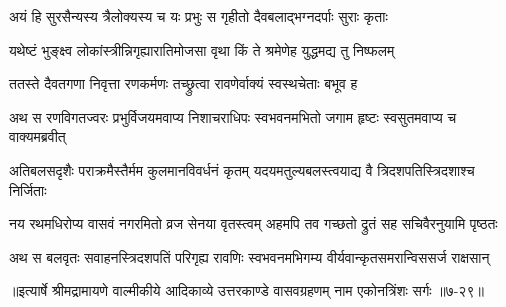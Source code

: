 \twolineshloka
{अयं हि सुरसैन्यस्य त्रैलोक्यस्य च यः प्रभुः}
{स गृहीतो दैवबलाद्भग्नदर्पाः सुराः कृताः} %

\twolineshloka
{यथेष्टं भुङ्क्ष्व लोकांस्त्रीन्निगृह्यारातिमोजसा}
{वृथा किं ते श्रमेणेह युद्धमद्य तु निष्फलम्} %

\twolineshloka
{ततस्ते दैवतगणा निवृत्ता रणकर्मणः}
{तच्छ्रुत्वा रावणेर्वाक्यं स्वस्थचेताः बभूव ह} %

\twolineshloka
{अथ स रणविगतज्वरः प्रभुर्विजयमवाप्य निशाचराधिपः}
{स्वभवनमभितो जगाम हृष्टः स्वसुतमवाप्य च वाक्यमब्रवीत्} %

\twolineshloka
{अतिबलसदृशैः पराक्रमैस्तैर्मम कुलमानविवर्धनं कृतम्}
{यदयमतुल्यबलस्त्वयाद्य वै त्रिदशपतिस्त्रिदशाश्च निर्जिताः} %

\twolineshloka
{नय रथमधिरोप्य वासवं नगरमितो व्रज सेनया वृतस्त्वम्}
{अहमपि तव गच्छतो द्रुतं सह सचिवैरनुयामि पृष्ठतः} %

\twolineshloka
{अथ स बलवृतः सवाहनस्त्रिदशपतिं परिगृह्य रावणिः}
{स्वभवनमभिगम्य वीर्यवान्कृतसमरान्विससर्ज राक्षसान्} %


॥इत्यार्षे श्रीमद्रामायणे वाल्मीकीये आदिकाव्ये उत्तरकाण्डे वासवग्रहणम् नाम एकोनत्रिंशः सर्गः ॥७-२९॥
